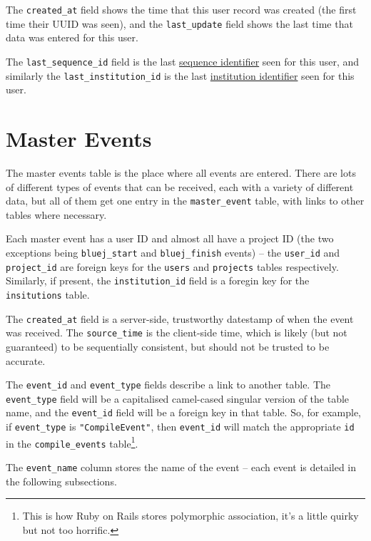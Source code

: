 \documentclass{book}
\begin{document}
The \texttt{created\_at} field shows the time that this user record was
created (the first time their UUID was seen), and the \texttt{last\_update} field shows the last time that data was entered for
this user.

The \texttt{last\_sequence\_id} field is the last \hyperref[def:sequence_id]{sequence identifier} seen for
this user, and similarly the \texttt{last\_institution\_id} is the last
\hyperref[def:institution_id]{institution identifier} seen for this user.

\chapter{Master Events}
\label{tab:master_events}


The master events table is the place where all events are entered.  There are
lots of different types of events that can be received, each with a variety of
different data, but all of them get one entry in the \texttt{master\_event}
table, with links to other tables where necessary.

Each master event has a user ID and almost all have a project ID (the two
exceptions being \texttt{bluej\_start} and \texttt{bluej\_finish} events) -- the
\texttt{user\_id} and \texttt{project\_id} are foreign keys for the
\texttt{users} and \texttt{projects} tables respectively.  Similarly, if
present, the \texttt{institution\_id} field is a foregin key for the
\texttt{insitutions} table.

The \texttt{created\_at} field is a server-side, trustworthy datestamp of when
the event was received.  The \texttt{source\_time} is the client-side time,
which is likely (but not guaranteed) to be sequentially consistent, but should
not be trusted to be accurate.

The \texttt{event\_id} and \texttt{event\_type} fields describe a link to
another table.  The \texttt{event\_type} field will be a capitalised
camel-cased singular version of the table name, and the \texttt{event\_id} field will
be a foreign key in that table.  So, for example, if \texttt{event\_type} is
\texttt{"CompileEvent"}, then \texttt{event\_id} will match the appropriate
\texttt{id} in the \texttt{compile\_events} table\footnote{This is how Ruby on
  Rails stores polymorphic association, it's a little quirky but not too
  horrific.}.

The \texttt{event\_name} column stores the name of the event -- each event is
detailed in the following subsections.
\end{document}
